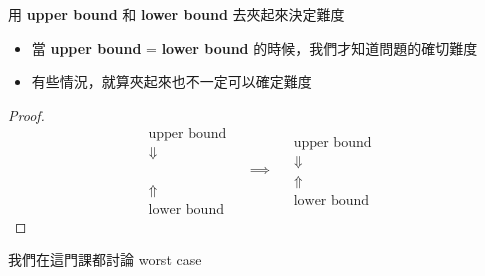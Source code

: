 \begin{theorem}
    用 \textbf{upper bound} 和 \textbf{lower bound} 去夾起來決定難度
    \begin{itemize}
        \item 當 \textbf{upper bound} = \textbf{lower bound} 的時候，我們才知道問題的確切難度
        \item 有些情況，就算夾起來也不一定可以確定難度
    \end{itemize}
\end{theorem}
\begin{proof}
    \[
    \begin{matrix}
        \boxed{\text{upper bound}}\\
        \Downarrow \\
        \\
        \\
        \\
        \Uparrow \\
        \boxed{\text{lower bound}}
    \end{matrix}\quad\implies\quad
    \begin{matrix}
        \boxed{\text{upper bound}}\\
        \Downarrow\\
        \Uparrow \\
        \boxed{\text{lower bound}}
    \end{matrix}
    \]
\end{proof}

\begin{note}
    我們在這門課都討論 worst case
\end{note}